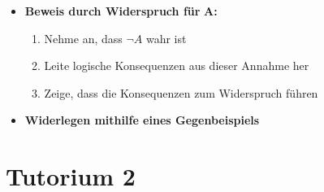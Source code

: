 \documentclass[ieeetran]{article}
\begin{document}
\begin{itemize}
\item \textbf{Beweis durch Widerspruch für }$\mathbf{A}$\textbf{:}
	\begin{enumerate}
		\item Nehme an, dass $\neg A$ wahr ist
		\item Leite logische Konsequenzen aus dieser Annahme her
		\item Zeige, dass die Konsequenzen zum Widerspruch führen
	\end{enumerate}
\item \textbf{Widerlegen mithilfe eines Gegenbeispiels}
\end{itemize}


\section{Tutorium 2} %
\label{sec:tutorium_2}
\end{document}
